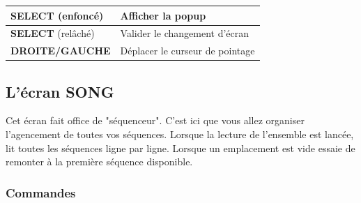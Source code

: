 \documentclass[12pt,a4paper]{article}
\begin{document}
    \tablelasttail{\hline}
    \begin{supertabular}{|l|l|}
    \hline
        {\bf SELECT} (enfoncé) & Afficher la popup \\
        \hline
        {\bf SELECT} (relâché) & Valider le changement d'écran \\
        \hline
        {\bf DROITE/GAUCHE} & Déplacer le curseur de pointage \\
    \hline
    \end{supertabular}
  
    \subsection{L'écran SONG}
    
    Cet écran fait office de "séquenceur".
    C'est ici que vous allez organiser l'agencement de toutes vos séquences.
    Lorsque la lecture de l'ensemble est lancée, \FAT lit toutes les séquences ligne par ligne.
    Lorsque un emplacement est vide \FAT essaie de remonter à la première séquence disponible.
    
    
        \subsubsection{Commandes}
        
\end{document}
